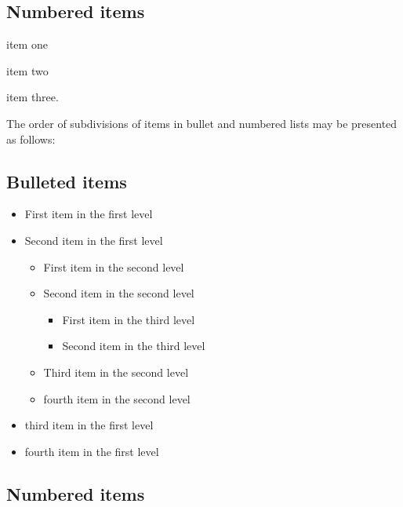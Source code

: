 \documentclass{ws-ijicc}
\begin{document}
\subsection*{Numbered items}

\begin{arabiclist}
\item item one
\item item two
\item item three.
\end{arabiclist}

The order of subdivisions of items in bullet and numbered lists may be
presented as follows:

\subsection*{Bulleted items}

\begin{itemize}
\item First item in the first level
\item Second item in the first level
\begin{itemize}
\item First item in the second level
\item Second item in the second level
\begin{itemize}
\item First item in the third level
\item Second item in the third level
\end{itemize}
\item Third item in the second level
\item fourth item in the second level
\end{itemize}
\item third item in the first level
\item fourth item in the first level
\end{itemize}

\subsection*{Numbered items}
\end{document}
